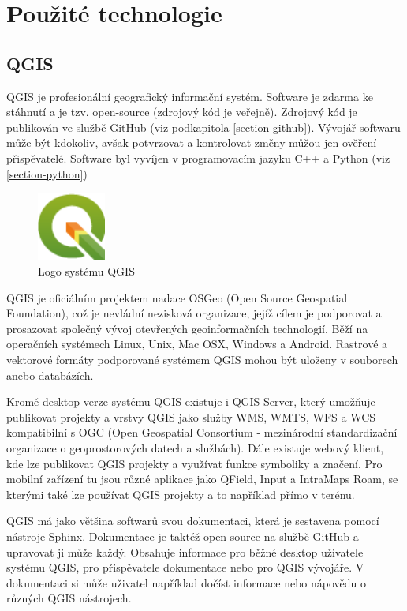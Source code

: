 \chapter{Použité technologie}
\label{4-technologie}

\section{QGIS}

QGIS je profesionální geografický informační systém.
Software je zdarma ke stáhnutí a je tzv. open-source (zdrojový kód je veřejně).
Zdrojový kód je publikován ve službě GitHub (viz podkapitola \ref{section-github}).
Vývojář softwaru může být kdokoliv, avšak potvrzovat a kontrolovat změny můžou jen ověření
přispěvatelé. Software byl vyvíjen v programovacím jazyku C++ a Python (viz \ref{section-python})

\begin{figure}[H] \centering
    \includegraphics[width=64pt]{./pictures/qgis-logo.png}
    \caption[Logo systému QGIS]{Logo systému QGIS \cite{qgis}}
	\label{fig:qgis-logo}                                
\end{figure}

QGIS je oficiálním projektem nadace OSGeo (Open Source Geospatial Foundation), což je nevládní 
nezisková organizace, jejíž cílem je podporovat a prosazovat společný vývoj otevřených geoinformačních
technologií. Běží na operačních systémech Linux, Unix, Mac OSX, Windows a Android.
Rastrové a vektorové formáty podporované systémem QGIS mohou být uloženy v souborech anebo databázích.


Kromě desktop verze systému QGIS existuje i QGIS Server, který umožňuje publikovat projekty a vrstvy
QGIS jako služby WMS, WMTS, WFS a WCS kompatibilní s OGC (Open Geospatial Consortium - mezinárodní standardizační organizace
o geoprostorových datech a službách). Dále existuje webový klient, kde lze publikovat
QGIS projekty a využívat funkce symboliky a značení. Pro mobilní zařízení tu jsou
různé aplikace jako QField, Input a IntraMaps Roam, se kterými také lze používat QGIS projekty a to 
například přímo v terénu. 


QGIS má jako většina softwarů svou dokumentaci, která je sestavena pomocí nástroje Sphinx. 
Dokumentace je taktéž open-source na službě GitHub a upravovat ji může každý. Obsahuje
informace pro běžné desktop uživatele systému QGIS, pro přispěvatele dokumentace nebo pro QGIS
vývojáře. V dokumentaci si může uživatel například dočíst informace nebo nápovědu o různých
QGIS nástrojech.

